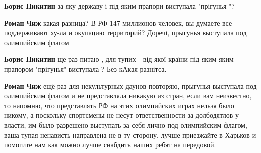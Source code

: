 \begin{itemize}
\begin{itemize}
\begin{itemize}
 
\textbf{Борис Никитин} за яку державу і під яким прапори виступала "прігунья "?

 
\textbf{Роман Чиж} какая разница? В РФ 147 миллионов человек, вы думаете все
поддерживают ху-ла и окупацию территорий? Доречi, прыгунья выступала под
олимпийским флагом
\end{itemize}

 
\textbf{Борис Никитин} ще раз питаю , для тупих - від якої країни під яким яким
прапором "прігунья" виступала ? Без кАкая разнітса.

\begin{itemize}
 
\textbf{Роман Чиж} ещё раз для некультурных даунов повторяю, прыгунья выступала
под олимпийским флагом и не представляла никакую из стран, если вам неизвестно,
то напомню, что представлять РФ на этих олимпийских играх нельзя было никому, а
поскольку спортсмены не несут ответственности за долбодятлов у власти, им было
разрешено выступать за себя лично под олимпийским флагом, ваша тупая ненависть
направлена не в ту сторону, лучше приезжайте в Харьков и помогите нам как можно
лучше снабдить наших ребят на передовой.

 

\end{itemize}
\end{itemize}
\end{itemize}
